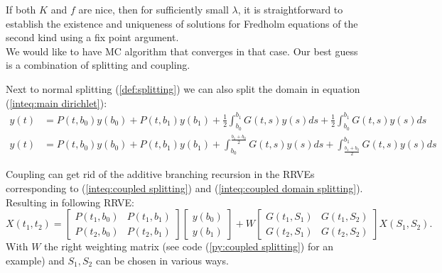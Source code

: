 \documentclass[a4paper,12pt]{article}
\begin{document}







If both $K$ and $f$ are nice, then for sufficiently small $\lambda$,
it is straightforward to establish the existence and uniqueness of solutions
for Fredholm equations of the second kind using a fix point argument. \\


We would like to have MC algorithm that converges in that case. Our best guess is
a combination of splitting and coupling.


\begin{example} \label{ex:coupled splitting}
    Next to normal splitting (\ref{def:splitting}) we can
    also split the domain in equation (\ref{inteq:main dirichlet}):
    \begin{align}\label{inteq:coupled splitting}
        y(t) & = P(t,b_{0}) y(b_{0}) + P(t,b_{1}) y(b_{1}) +
        \frac{1}{2} \int_{b_{0}}^{b_{1}} G(t,s)y(s) ds +
        \frac{1}{2} \int_{b_{0}}^{b_{1}} G(t,s)y(s) ds                                              \\
        y(t) & = P(t,b_{0}) y(b_{0}) + P(t,b_{1}) y(b_{1}) + \label{inteq:coupled domain splitting}
        \int_{b_{0}}^{\frac{b_{1}+b_{0}}{2}} G(t,s)y(s) ds +
        \int_{\frac{b_{1}+b_{0}}{2}}^{b_{1}} G(t,s)y(s) ds
    \end{align}

    Coupling can get rid of the additive branching recursion in the RRVEs corresponding
    to (\ref{inteq:coupled splitting}) and (\ref{inteq:coupled domain splitting}).
    Resulting in following RRVE:
    \begin{equation} \label{RRVE:coupled splitting}
        X(t_{1},t_{2})=
        \begin{bmatrix}
            P(t_{1},b_{0}) & P(t_{1},b_{1}) \\
            P(t_{2},b_{0}) & P(t_{2},b_{1})
        \end{bmatrix}
        \begin{bmatrix}
            y(b_{0}) \\
            y(b_{1})
        \end{bmatrix}
        +
        W
        \begin{bmatrix}
            G(t_{1},S_{1}) & G(t_{1},S_{2}) \\
            G(t_{2},S_{1}) & G(t_{2},S_{2})
        \end{bmatrix}
        X(S_{1},S_{2}).
    \end{equation}
    With $W$ the right weighting matrix (see code (\ref{py:coupled splitting}) for an example)
    and $S_{1},S_{2}$ can be chosen in various ways.
\end{example}
\end{document}
